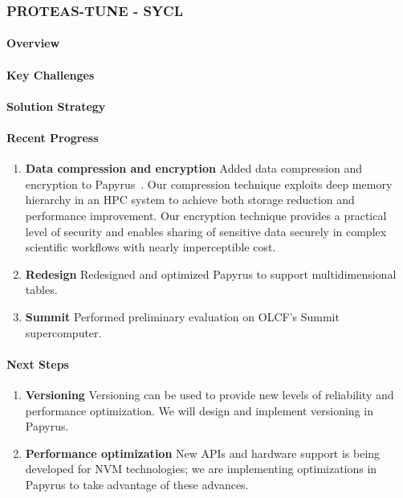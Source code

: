 \subsubsection{ PROTEAS-TUNE - SYCL}\label{s:sycl}


\paragraph{Overview}


\paragraph{Key Challenges}


\paragraph{Solution Strategy}


\paragraph{Recent Progress}


\begin{enumerate}
\item \textbf{Data compression and encryption}
  Added data compression and encryption to Papyrus~\cite{Kim:2019:IED}.
  Our compression technique exploits deep memory hierarchy in an HPC system to achieve both storage reduction and performance improvement.
  Our encryption technique provides a practical level of security and enables sharing of sensitive data securely in complex scientific workflows with nearly imperceptible cost.
\item \textbf{Redesign}
  Redesigned and optimized Papyrus to support multidimensional tables.
\item \textbf{Summit}
  Performed preliminary evaluation on OLCF's Summit supercomputer.
\end{enumerate}

\paragraph{Next Steps}

\begin{enumerate}
\item \textbf{Versioning} Versioning can be used to provide new levels of reliability and performance optimization. We will design and implement versioning in Papyrus.

\item \textbf{Performance optimization} New APIs and hardware support is being developed for NVM technologies; we are implementing optimizations in Papyrus to take advantage of these advances.

\end{enumerate}
